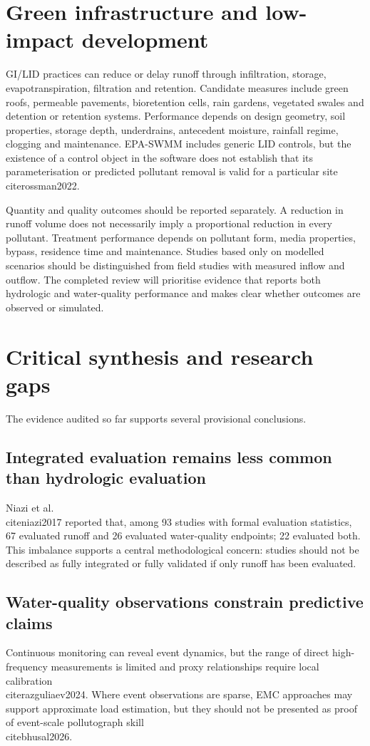 \documentclass[journal]{IEEEtran}
\begin{document}
\section{Green infrastructure and low-impact development}
GI/LID practices can reduce or delay runoff through infiltration, storage, evapotranspiration, filtration and retention. Candidate measures include green roofs, permeable pavements, bioretention cells, rain gardens, vegetated swales and detention or retention systems. Performance depends on design geometry, soil properties, storage depth, underdrains, antecedent moisture, rainfall regime, clogging and maintenance. EPA-SWMM includes generic LID controls, but the existence of a control object in the software does not establish that its parameterisation or predicted pollutant removal is valid for a particular site \\cite{rossman2022}.

Quantity and quality outcomes should be reported separately. A reduction in runoff volume does not necessarily imply a proportional reduction in every pollutant. Treatment performance depends on pollutant form, media properties, bypass, residence time and maintenance. Studies based only on modelled scenarios should be distinguished from field studies with measured inflow and outflow. The completed review will prioritise evidence that reports both hydrologic and water-quality performance and makes clear whether outcomes are observed or simulated.

\section{Critical synthesis and research gaps}
The evidence audited so far supports several provisional conclusions.

\subsection{Integrated evaluation remains less common than hydrologic evaluation}
Niazi et al. \\cite{niazi2017} reported that, among 93 studies with formal evaluation statistics, 67 evaluated runoff and 26 evaluated water-quality endpoints; 22 evaluated both. This imbalance supports a central methodological concern: studies should not be described as fully integrated or fully validated if only runoff has been evaluated.

\subsection{Water-quality observations constrain predictive claims}
Continuous monitoring can reveal event dynamics, but the range of direct high-frequency measurements is limited and proxy relationships require local calibration \\cite{razguliaev2024}. Where event observations are sparse, EMC approaches may support approximate load estimation, but they should not be presented as proof of event-scale pollutograph skill \\cite{bhusal2026}.
\end{document}
